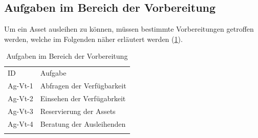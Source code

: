 \subsection{Aufgaben im Bereich der Vorbereitung}
Um ein Asset ausleihen zu können, müssen bestimmte Vorbereitungen getroffen
werden, welche im Folgenden näher erläutert werden (\ref{table:Ag-Vt}).

\begin{table}[h]
        \centering
        \caption{Aufgaben im Bereich der Vorbereitung}
        \begin{tabular}{ll}
                \arrayrulecolor{maincolor}\hline
                \sffamily\color{maincolor}ID & \sffamily\color{maincolor}Aufgabe
                \\
                \arrayrulecolor{maincolor}\hline
                Ag-Vt-1                      & Abfragen der Verfügbarkeit
                \\
                Ag-Vt-2                      & Einsehen der Verfügabrkeit
                \\
                Ag-Vt-3                      & Reservierung der Assets
                \\
                Ag-Vt-4                      & Beratung der Ausleihenden
                \\
                \arrayrulecolor{maincolor}\hline
        \end{tabular}
        \label{table:Ag-Vt}
\end{table}

